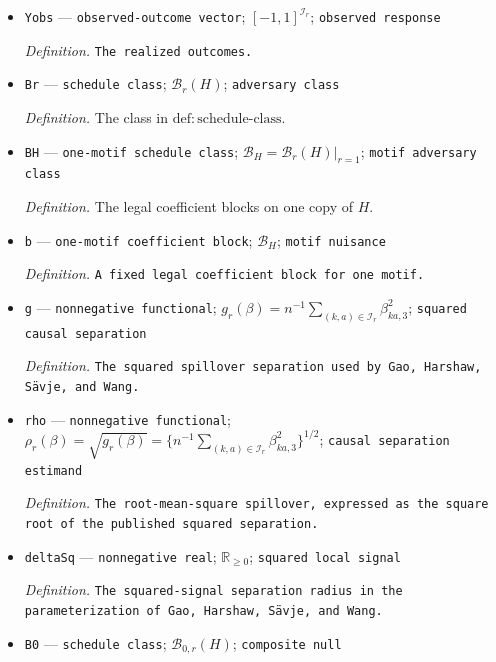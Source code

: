\documentclass{article}
\begin{document}
\begin{itemize}
  \par\smallskip\noindent\emph{Definition.} \texttt{The network linear-\allowbreak{}in-\allowbreak{}means schedule.}
  \item \texttt{Yobs} --- \texttt{observed-\allowbreak{}outcome vector}; \([-1,1]^{\mathcal I_r}\); \texttt{observed response}
  \par\smallskip\noindent\emph{Definition.} \texttt{The realized outcomes.}
  \item \texttt{Br} --- \texttt{schedule class}; \(\mathcal B_r(H)\); \texttt{adversary class}
  \par\smallskip\noindent\emph{Definition.} The class in \(\mathrm{def:schedule\text{-}class}\).
  \item \texttt{BH} --- \texttt{one-\allowbreak{}motif schedule class}; \(\mathcal B_H=\mathcal B_r(H)|_{r=1}\); \texttt{motif adversary class}
  \par\smallskip\noindent\emph{Definition.} The legal coefficient blocks on one copy of \(H\).
  \item \texttt{b} --- \texttt{one-\allowbreak{}motif coefficient block}; \(\mathcal B_H\); \texttt{motif nuisance}
  \par\smallskip\noindent\emph{Definition.} \texttt{A fixed legal coefficient block for one motif.}
  \item \texttt{g} --- \texttt{nonnegative functional}; \(g_r(\beta)=n^{-1}\sum_{(k,a)\in\mathcal I_r}\beta_{ka,3}^2\); \texttt{squared causal separation}
  \par\smallskip\noindent\emph{Definition.} \texttt{The squared spillover separation used by Gao,\allowbreak{} Harshaw,\allowbreak{} Sävje,\allowbreak{} and Wang.}
  \item \texttt{rho} --- \texttt{nonnegative functional}; \(\rho_r(\beta)=\sqrt{g_r(\beta)}=\{n^{-1}\sum_{(k,a)\in\mathcal I_r}\beta_{ka,3}^2\}^{1/2}\); \texttt{causal separation estimand}
  \par\smallskip\noindent\emph{Definition.} \texttt{The root-\allowbreak{}mean-\allowbreak{}square spillover,\allowbreak{} expressed as the square root of the published squared separation.}
  \item \texttt{deltaSq} --- \texttt{nonnegative real}; \(\mathbb R_{\ge0}\); \texttt{squared local signal}
  \par\smallskip\noindent\emph{Definition.} \texttt{The squared-\allowbreak{}signal separation radius in the parameterization of Gao,\allowbreak{} Harshaw,\allowbreak{} Sävje,\allowbreak{} and Wang.}
  \item \texttt{B0} --- \texttt{schedule class}; \(\mathcal B_{0,r}(H)\); \texttt{composite null}

\end{itemize}
\end{document}
